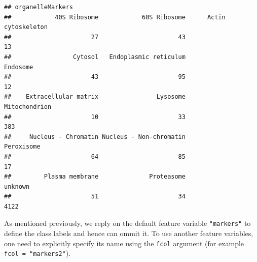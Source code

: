 \begin{Shaded}
\begin{Highlighting}[]
\StringTok{ }\NormalTok{(} \NormalTok{))}
\end{Highlighting}
\end{Shaded}

\begin{verbatim}
## organelleMarkers
##            40S Ribosome            60S Ribosome      Actin cytoskeleton 
##                      27                      43                      13 
##                 Cytosol   Endoplasmic reticulum                Endosome 
##                      43                      95                      12 
##    Extracellular matrix                Lysosome           Mitochondrion 
##                      10                      33                     383 
##     Nucleus - Chromatin Nucleus - Non-chromatin              Peroxisome 
##                      64                      85                      17 
##         Plasma membrane              Proteasome                 unknown 
##                      51                      34                    4122
\end{verbatim}

\begin{Shaded}
\begin{Highlighting}[]
\StringTok{ }\NormalTok{/w[}\NormalTok{]}
\end{Highlighting}
\end{Shaded}

\begin{Shaded}
\begin{Highlighting}[]
\StringTok{ } \NormalTok{,}
                           \NormalTok{, } \NormalTok{,}
                           
\end{Highlighting}
\end{Shaded}

As mentioned previously, we reply on the default feature variable
\texttt{"markers"} to define the class labels and hence can ommit it. To
use another feature variables, one need to explicitly specify its name
using the \texttt{fcol} argument (for example
\texttt{fcol = "markers2"}).

